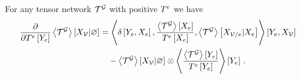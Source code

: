 \begin{lemma}
    \label{lem:difMNprob}
    For any tensor network $\mathcal{T}^{\mathcal{G}}$ with positive $T^{e}$ we have
    \begin{align*}
        \frac{\partial }{\partial T^{e}\left[Y_{e}\right]} \left\langle \mathcal{T}^{\mathcal{G}}\right\rangle \left[ X_{\mathcal{V}} | \varnothing \right]
        & = \left\langle 
            \delta\left[Y_{e},X_{e}\right],
            \frac{\left\langle \mathcal{T}^{\mathcal{G}}\right\rangle \left[ X_{e} \right]}{T^{e}\left[X_{e}\right]},
            \left\langle \mathcal{T}^{\mathcal{G}}\right\rangle \left[ X_{\mathcal{V}/e} | X_{e} \right] \right\rangle \left[ Y_{e},X_{\mathcal{V}} \right] \\
        & \quad -  \left\langle \mathcal{T}^{\mathcal{G}}\right\rangle \left[ X_{\mathcal{V}} | \varnothing \right] \otimes \left\langle \frac{\left\langle \mathcal{T}^{\mathcal{G}}\right\rangle \left[ Y_{e} \right]}{T^{e}\left[Y_{e}\right]}
        \right\rangle \left[ Y_{e} \right] \, .
    \end{align*}
\end{lemma}

